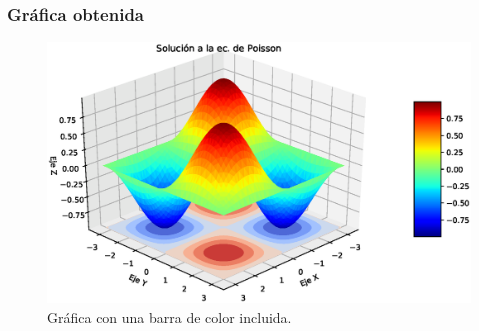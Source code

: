 {
\begin{frame}
\frametitle{Gráfica obtenida}
\begin{figure}[h!]
   \centering
   \includegraphics[scale=0.5]{Imagenes/Ejercicio_Ec_Poisson_02.eps}
   \caption{Gráfica con una barra de color incluida.}
\end{figure}
\end{frame}
}

